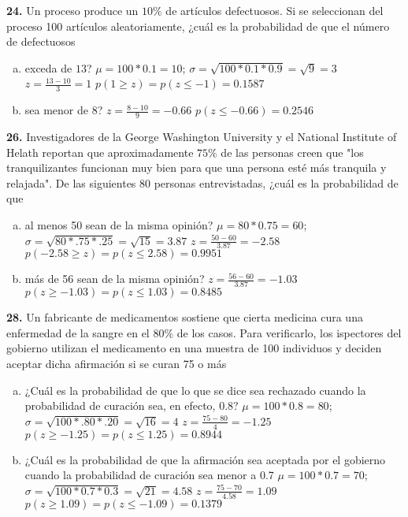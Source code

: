 \documentclass[12pt, letterpaper]{article}
\begin{document}
    \textbf{24. }Un proceso produce un $10\%$ de artículos defectuosos. Si se seleccionan del proceso 100 artículos
    aleatoriamente, ¿cuál es la probabilidad de que el número de defectuosos
    \begin{enumerate}[a)]
        \item exceda de $13$?\vskip0.5cm
        $\mu = 100*0.1=10$; $\sigma = \sqrt{100*0.1*0.9}=\sqrt{9}=3$\vskip0.5cm
        $z=\displaystyle\frac{13-10}{3}=1$\vskip0.5cm
        $p(1\geq z)=p(z\leq -1)=0.1587$
        \item sea menor de $8$?\vskip0.5cm
        $z=\displaystyle\frac{8-10}{9}=-0.66$\vskip0.5cm
        $p(z\leq -0.66)=0.2546$
    \end{enumerate}\vskip1cm

    \textbf{26. }Investigadores de la George Washington University y el National Institute of Helath reportan que
    aproximadamente $75\%$ de las personas creen que "los tranquilizantes funcionan muy bien para que una persona esté
    más tranquila y relajada". De las siguientes 80 personas entrevistadas, ¿cuál es la probabilidad de que
    \begin{enumerate}[a)]
        \item al menos 50 sean de la misma opinión?\vskip0.5cm
        $\mu = 80*0.75=60$; $\sigma = \sqrt{80*.75*.25}=\sqrt{15}=3.87$\vskip0.5cm
        $z=\displaystyle\frac{50-60}{3.87}=-2.58$\vskip0.5cm
        $p(-2.58\geq z)=p(z\leq 2.58)=0.9951$\vskip0.5cm
        \item más de 56 sean de la misma opinión?\vskip0.5cm
        $z=\displaystyle\frac{56-60}{3.87}=-1.03$\vskip0.5cm
        $p(z\geq -1.03)=p(z\leq 1.03)=0.8485$
    \end{enumerate}\vskip1cm

    \textbf{28. }Un fabricante de medicamentos sostiene que cierta medicina cura una enfermedad de la sangre en el $80\%$
    de los casos. Para verificarlo, los ispectores del gobierno utilizan el medicamento en una muestra de 100 individuos y
    deciden aceptar dicha afirmación si se curan 75 o más
    \begin{enumerate}[a)]
        \item ¿Cuál es la probabilidad de que lo que se dice sea rechazado cuando la probabilidad de curación sea,
        en efecto, 0.8?\vskip0.5cm
        $\mu = 100*0.8=80$; $\sigma = \sqrt{100*.80*.20}=\sqrt{16}=4$\vskip0.5cm
        $z=\displaystyle\frac{75-80}{4}=-1.25$\vskip0.5cm
        $p(z\geq -1.25)=p(z\leq 1.25)=0.8944$
        \item ¿Cuál es la probabilidad de que la afirmación sea aceptada por el gobierno cuando la probabilidad de
        curación sea menor a 0.7\vskip0.5cm
        $\mu=100*0.7=70$; $\sigma = \sqrt{100*0.7*0.3}=\sqrt{21}=4.58$\vskip0.5cm
        $z=\displaystyle\frac{75-70}{4.58}=1.09$\vskip0.5cm
        $p(z\geq 1.09)=p(z\leq -1.09)=0.1379$
    \end{enumerate}\vskip1cm
\end{document}

